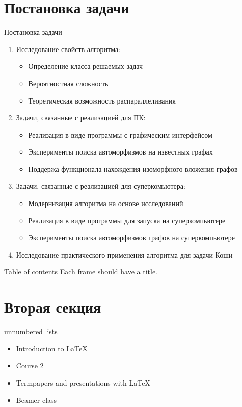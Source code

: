 \documentclass{beamer}
\begin{document}
\section{Постановка задачи}
\begin{frame}{Постановка задачи}
\small
\begin{enumerate}
\item Исследование свойств алгоритма:
\begin{itemize}
\scriptsize
\item Определение класса решаемых задач
\item Вероятностная сложность
\item Теоретическая возможность распараллеливания
\end{itemize}
\item Задачи, связанные с реализацией для ПК:
\begin{itemize}
\scriptsize
\item Реализация в виде программы с графическим интерфейсом
\item Эксперименты поиска автоморфизмов на известных графах
\item Поддержа функционала нахождения изоморфного вложения графов
\end{itemize}
\item Задачи, связанные с реализацией для суперкомьютера:
\begin{itemize}
\scriptsize
\item Модернизация алгоритма на основе исследований
\item Реализация в виде программы для запуска на суперкомпьютере
\item Эксперименты поиска автоморфизмов графов на суперкомпьютере
\end{itemize}
\item Исследование практического применения алгоритма для задачи Коши
\end{enumerate}
\end{frame} 


\begin{frame}{Table of contents}
Each frame should have a title.
\end{frame} 


\section{Вторая секция}
\begin{frame}{unnumbered lists}
\begin{itemize}
\item Introduction to  \LaTeX  
\item Course 2 
\item Termpapers and presentations with \LaTeX 
\item Beamer class
\end{itemize} 
\end{frame}
\end{document}
